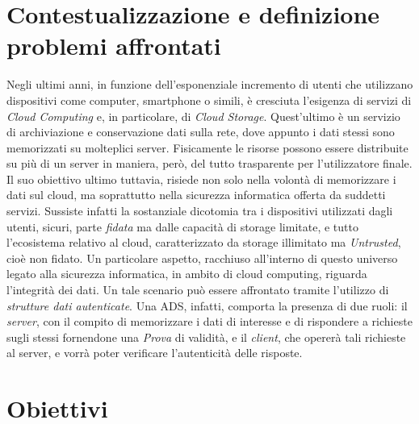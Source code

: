 \section{Contestualizzazione e definizione problemi affrontati}
	

	Negli ultimi anni, in funzione dell'esponenziale incremento di utenti che utilizzano dispositivi come computer, smartphone o simili, è cresciuta l'esigenza di servizi di \textit{Cloud Computing} e, in particolare, di \textit{Cloud Storage}. Quest'ultimo è un servizio di archiviazione e conservazione dati sulla rete, dove appunto i dati stessi sono memorizzati su molteplici server. Fisicamente le risorse possono essere distribuite su più di un server in maniera, però, del tutto trasparente per l'utilizzatore finale. Il suo obiettivo ultimo tuttavia, risiede non solo nella volontà di memorizzare i dati sul cloud, ma soprattutto nella sicurezza informatica offerta da suddetti servizi.
	Sussiste infatti la sostanziale dicotomia tra i dispositivi utilizzati dagli utenti, sicuri, parte \textit{fidata} ma dalle capacità di storage limitate, e tutto l'ecosistema relativo al cloud, caratterizzato da storage illimitato ma \textit{Untrusted}, cioè non fidato.
	Un particolare aspetto, racchiuso all'interno di questo universo legato alla sicurezza informatica, in ambito di cloud computing, riguarda l'integrità dei dati. Un tale scenario può essere affrontato tramite l'utilizzo di \textit{strutture dati autenticate}. Una ADS, infatti, comporta la presenza di due ruoli: il \textit{server}, con il compito di memorizzare i dati di interesse e di rispondere a richieste sugli stessi fornendone una \textit{Prova} di validità, e il \textit{client}, che opererà tali richieste al server, e vorrà poter verificare l'autenticità delle risposte.
	
	
\section{Obiettivi}


